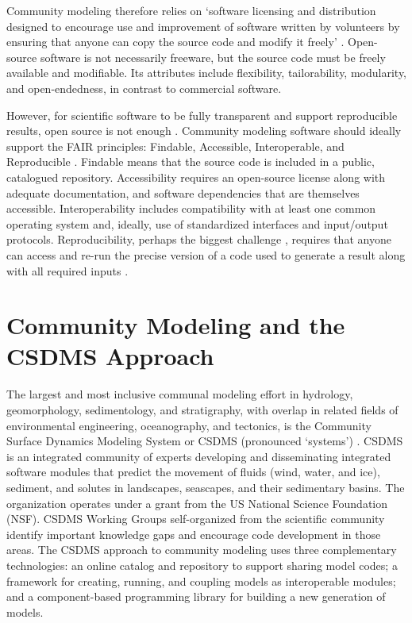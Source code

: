 \documentclass[10pt,twocolumn,preprint]{elsarticle}
\begin{document}
Community modeling therefore relies on `software licensing and distribution designed to encourage use and improvement of software written by volunteers by ensuring that anyone can copy the source code and modify it freely' \citep{jesiek2003democratizing}. Open-source software is not necessarily freeware, but the source code must be freely available and modifiable. Its attributes include flexibility, tailorability, modularity, and open-endedness, in contrast to commercial software.

However, for scientific software to be fully transparent and support reproducible results, open source is not enough \citep{chen2019open}. Community modeling software should ideally support the FAIR principles: Findable, Accessible, Interoperable, and Reproducible \citep{wilkinson2016fair}. Findable means that the source code is included in a public, catalogued repository. Accessibility requires an open-source license along with adequate documentation, and software dependencies that are themselves accessible. Interoperability includes compatibility with at least one common operating system and, ideally, use of standardized interfaces and input/output protocols. Reproducibility, perhaps the biggest challenge \citep{barba2016hard}, requires that anyone can access and re-run the precise version of a code used to generate a result along with all required inputs \citep{fomel2009reproducible,peng2011reproducible,stodden2013setting}.

\section{Community Modeling and the CSDMS Approach}

The largest and most inclusive communal modeling effort in hydrology, geomorphology, sedimentology, and stratigraphy, with overlap in related fields of environmental engineering, oceanography, and tectonics, is the Community Surface Dynamics Modeling System or CSDMS (pronounced `systems') \citep{tucker2021numerical}. CSDMS is an integrated community of experts developing and disseminating integrated software modules that predict the movement of fluids (wind, water, and ice), sediment, and solutes in landscapes, seascapes, and their sedimentary basins. The organization operates under a grant from the US National Science Foundation (NSF). CSDMS Working Groups self-organized from the scientific community identify important knowledge gaps and encourage code development in those areas. The CSDMS approach to community modeling uses three complementary technologies: an online catalog and repository to support sharing model codes; a framework for creating, running, and coupling models as interoperable modules; and a component-based programming library for building a new generation of models.
\end{document}

